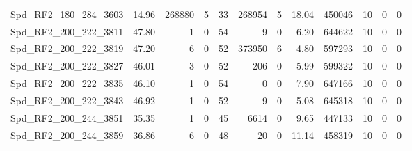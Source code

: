 \begin{longtable}[c]{@{}lrrrrrrrrrrr@{}}
Spd\_RF2\_180\_284\_3603      & 14.96                  & 268880                  & 5                       & 33                     & 268954                  & 5                       & 18.04                   & 450046                   & 10                       & 0                        & 0                        \\
Spd\_RF2\_200\_222\_3811      & 47.80                  & 1                       & 0                       & 54                     & 9                       & 0                       & 6.20                    & 644622                   & 10                       & 0                        & 0                        \\
Spd\_RF2\_200\_222\_3819      & 47.20                  & 6                       & 0                       & 52                     & 373950                  & 6                       & 4.80                    & 597293                   & 10                       & 0                        & 0                        \\
Spd\_RF2\_200\_222\_3827      & 46.01                  & 3                       & 0                       & 52                     & 206                     & 0                       & 5.99                    & 599322                   & 10                       & 0                        & 0                        \\
Spd\_RF2\_200\_222\_3835      & 46.10                  & 1                       & 0                       & 54                     & 0                       & 0                       & 7.90                    & 647166                   & 10                       & 0                        & 0                        \\
Spd\_RF2\_200\_222\_3843      & 46.92                  & 1                       & 0                       & 52                     & 9                       & 0                       & 5.08                    & 645318                   & 10                       & 0                        & 0                        \\
Spd\_RF2\_200\_244\_3851      & 35.35                  & 1                       & 0                       & 45                     & 6614                    & 0                       & 9.65                    & 447133                   & 10                       & 0                        & 0                        \\
Spd\_RF2\_200\_244\_3859      & 36.86                  & 6                       & 0                       & 48                     & 20                      & 0                       & 11.14                   & 458319                   & 10                       & 0                        & 0                        \\

\end{longtable}

